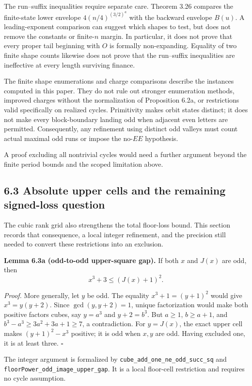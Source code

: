\documentclass[12pt]{article}
\begin{document}
The run--suffix inequalities require separate care. Theorem 3.26
compares the finite-state lower envelope \(4(n/4)^{(3/2)^a}\) with the
backward envelope \(B(u)\). A leading-exponent comparison can suggest
which shapes to test, but does not remove the constants or finite-\(n\)
margin. In particular, it does not prove that every proper tail
beginning with \(O\) is formally non-expanding. Equality of two finite
shape counts likewise does not prove that the run--suffix inequalities
are ineffective at every length surviving finance.

The finite shape enumerations and charge comparisons describe the
instances computed in this paper. They do not rule out stronger
enumeration methods, improved charges without the normalization of
Proposition 6.2a, or restrictions valid specifically on realized cycles.
Primitivity makes orbit states distinct; it does not make every
block-boundary landing odd when adjacent even letters are permitted.
Consequently, any refinement using distinct odd valleys must count
actual maximal odd runs or impose the no-\(EE\) hypothesis.

A proof excluding all nontrivial cycles would need a further argument
beyond the finite period bounds and the scoped limitation above.

\subsection{6.3 Absolute upper cells and the remaining signed-loss
question}\label{absolute-upper-cells-and-the-remaining-signed-loss-question}

The cubic rank grid also strengthens the total floor-loss bound. This
section records that consequence, a local integer refinement, and the
precision still needed to convert these restrictions into an exclusion.

\textbf{Lemma 6.3a (odd-to-odd upper-square gap).} If both \(x\) and
\(J(x)\) are odd, then \[
x^3+3\le(J(x)+1)^2.
\tag{UC1}
\]

\emph{Proof.} More generally, let \(y\) be odd. The equality
\(x^3+1=(y+1)^2\) would give \(x^3=y(y+2)\). Since \(\gcd(y,y+2)=1\),
unique factorization would make both positive factors cubes, say
\(y=a^3\) and \(y+2=b^3\). But \(a\ge1\), \(b\ge a+1\), and
\(b^3-a^3\ge3a^2+3a+1\ge7\), a contradiction. For \(y=J(x)\), the exact
upper cell makes \((y+1)^2-x^3\) positive; it is odd when \(x,y\) are
odd. Having excluded one, it is at least three. \(\square\)

The integer argument is formalized by
\texttt{\nolinkurl{cube_add_one_ne_odd_succ_sq}} and
\texttt{\nolinkurl{floorPower_odd_image_upper_gap}}. It is a local
floor-cell restriction and requires no cycle assumption.
\end{document}
